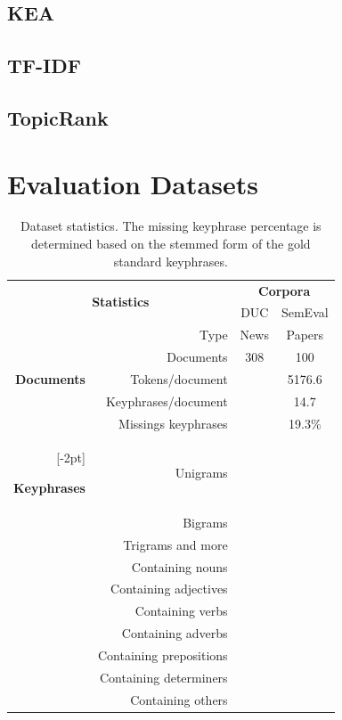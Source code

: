   \subsection{KEA}
  \label{subsec:kea}
  \subsection{TF-IDF}
  \label{subsec:tfidf}
  \subsection{TopicRank}
  \label{subsec:topicrank}

\section{Evaluation Datasets}
\label{sec:evaluation_datasets}

  \begin{table}[h]
    \centering
    \begin{tabular}{@{~}r@{~~}r@{~~}c@{~~}c@{~}}
      \toprule
      \multicolumn{2}{c}{\multirow{2}{*}[-2pt]{\textbf{Statistics}}} & \multicolumn{2}{c}{\textbf{Corpora}}\\
      \cmidrule{3-4}
      & & DUC & SemEval\\
      \midrule
      \multirow{5}{*}[-2pt]{\begin{sideways}\textbf{Documents}\end{sideways}} & Type & News & Papers\\
      & Documents & 308 & 100\\
      & Tokens/document & & 5176.6\\
      & Keyphrases/document & & 14.7\\
      & Missings keyphrases & & 19.3\%\\
      \addlinespace[\defaultaddspace]
      \multirow{10}{*}[-2pt]{\begin{sideways}\textbf{Keyphrases}\end{sideways}} & Unigrams & & \\
      & Bigrams & & \\
      & Trigrams and more & & \\
      & Containing nouns & & \\
      & Containing adjectives & & \\
      & Containing verbs & & \\
      & Containing adverbs & & \\
      & Containing prepositions & & \\
      & Containing determiners & & \\
      & Containing others & & \\
      \bottomrule
    \end{tabular}
    \caption{Dataset statistics. The missing keyphrase percentage is determined
             based on the stemmed form of the gold standard keyphrases.
             \label{tab:dataset_statistics}}
  \end{table}

